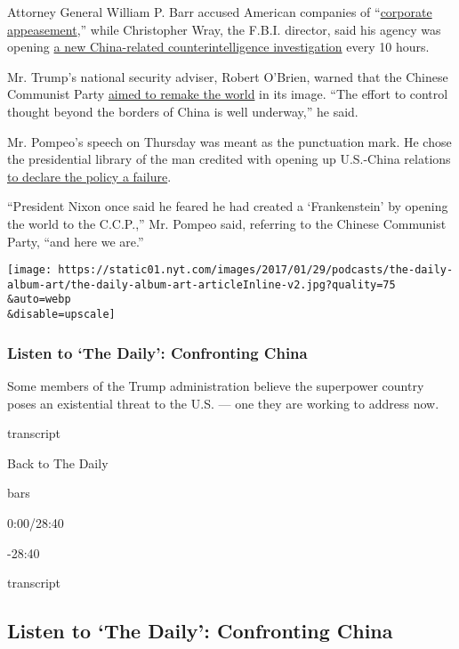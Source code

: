 Attorney General William P. Barr accused American companies of
``\href{https://www.justice.gov/opa/speech/attorney-general-william-p-barr-delivers-remarks-china-policy-gerald-r-ford-presidential}{corporate
appeasement},'' while Christopher Wray, the F.B.I. director, said his
agency was opening
\href{https://www.fbi.gov/news/speeches/the-threat-posed-by-the-chinese-government-and-the-chinese-communist-party-to-the-economic-and-national-security-of-the-united-states}{a
new China-related counterintelligence investigation} every 10 hours.

Mr. Trump's national security adviser, Robert O'Brien, warned that the
Chinese Communist Party
\href{https://www.whitehouse.gov/briefings-statements/chinese-communist-partys-ideology-global-ambitions/}{aimed
to remake the world} in its image. ``The effort to control thought
beyond the borders of China is well underway,'' he said.

Mr. Pompeo's speech on Thursday was meant as the punctuation mark. He
chose the presidential library of the man credited with opening up
U.S.-China relations
\href{https://www.state.gov/communist-china-and-the-free-worlds-future/}{to
declare the policy a failure}.

``President Nixon once said he feared he had created a `Frankenstein' by
opening the world to the C.C.P.,'' Mr. Pompeo said, referring to the
Chinese Communist Party, ``and here we are.''

\texttt{[image: https://static01.nyt.com/images/2017/01/29/podcasts/the-daily-album-art/the-daily-album-art-articleInline-v2.jpg?quality=75\\\&auto=webp\\\&disable=upscale]}

\hypertarget{listen-to-the-daily-confronting-china}{%
\subsubsection{Listen to `The Daily': Confronting
China}\label{listen-to-the-daily-confronting-china}}

Some members of the Trump administration believe the superpower country
poses an existential threat to the U.S. --- one they are working to
address now.

transcript

Back to The Daily

bars

0:00/28:40

-28:40

transcript

\hypertarget{listen-to-the-daily-confronting-china-1}{%
\subsection{Listen to `The Daily': Confronting
China}\label{listen-to-the-daily-confronting-china-1}}

